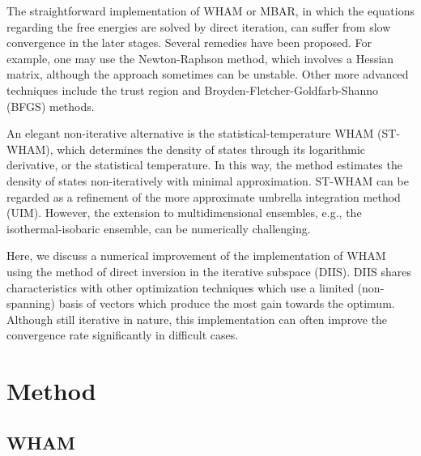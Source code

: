 \documentclass[reprint,aip,jcp,superscriptaddress]{revtex4-1}
\begin{document}
The straightforward implementation of WHAM or MBAR,
in which the equations regarding the free energies
are solved by direct iteration,
can suffer from
slow convergence in the later stages.
%
Several remedies have been proposed\cite{
shirts2008, bereau2009, kim2011, zhu2012}.
%
For example, one may use the Newton-Raphson method,
which involves a Hessian matrix,
although the approach sometimes can be unstable\cite{
shirts2008}.
%
Other more advanced techniques include
the trust region and Broyden-Fletcher-Goldfarb-Shanno (BFGS) methods\cite{zhu2012}.



An elegant non-iterative alternative is
the statistical-temperature WHAM (ST-WHAM)\cite{
kim2011}, which
determines the density of states
through its logarithmic derivative,
or the statistical temperature.
%
In this way,
the method estimates
the density of states non-iteratively
with minimal approximation.
%
ST-WHAM can be regarded as a refinement of
the more approximate umbrella integration method (UIM)\cite{
kastner2005, *kastner2009}.
%
However, the extension to multidimensional ensembles,
e.g., the isothermal-isobaric ensemble,
can be numerically challenging\cite{kim2011}.



Here, we discuss a numerical improvement of
the implementation of WHAM using
the method of direct inversion in the iterative subspace (DIIS)\cite{
pulay1980, *pulay1982, *hamilton1986,
kovalenko1999, howard2011}.
%
DIIS shares characteristics with other optimization techniques which use a limited (non-spanning) basis of vectors which produce the most gain towards the optimum.
%
Although still iterative in nature,
this implementation
can often improve
the convergence rate
significantly in difficult cases.





\section{Method}





\subsection{WHAM}
\end{document}
